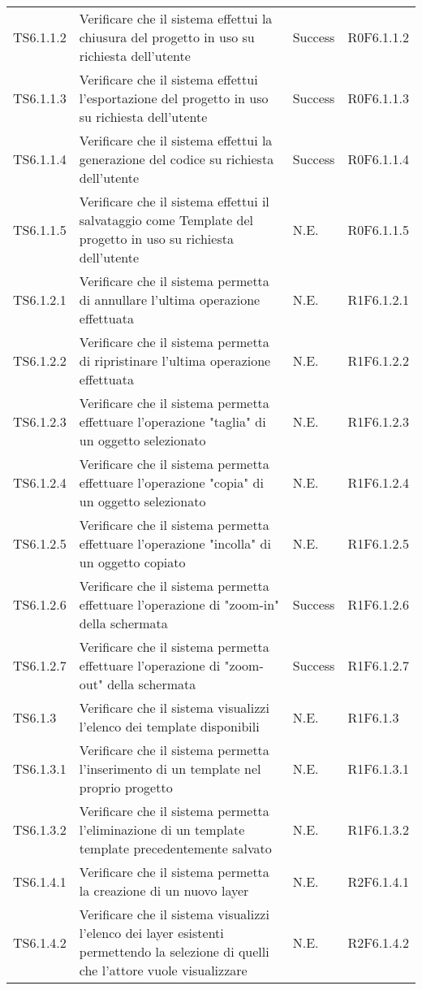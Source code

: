 \begin{longtable}{p{2.5cm}!{\VRule[1pt]}p{6cm}!{\VRule[1pt]}p{1.5cm}!{\VRule[1pt]}p{3cm}}
TS6.1.1.2 & Verificare che il sistema effettui la chiusura del progetto in uso su richiesta dell'utente & Success & R0F6.1.1.2\\
TS6.1.1.3 & Verificare che il sistema effettui l'esportazione del progetto in uso su richiesta dell'utente & Success & R0F6.1.1.3\\
TS6.1.1.4 & Verificare che il sistema effettui la generazione del codice su richiesta dell'utente & Success & R0F6.1.1.4\\
TS6.1.1.5 & Verificare che il sistema effettui il salvataggio come Template del progetto in uso su richiesta dell'utente & N.E. & R0F6.1.1.5\\
TS6.1.2.1 & Verificare che il sistema permetta di annullare l'ultima operazione effettuata & N.E. & R1F6.1.2.1\\
TS6.1.2.2 & Verificare che il sistema permetta di ripristinare l'ultima operazione effettuata & N.E. & R1F6.1.2.2\\
TS6.1.2.3 & Verificare che il sistema permetta effettuare l'operazione "taglia" di un oggetto selezionato & N.E. & R1F6.1.2.3\\
TS6.1.2.4 & Verificare che il sistema permetta effettuare l'operazione "copia" di un oggetto selezionato & N.E. & R1F6.1.2.4\\
TS6.1.2.5 & Verificare che il sistema permetta effettuare l'operazione "incolla" di un oggetto copiato & N.E. & R1F6.1.2.5\\
TS6.1.2.6 & Verificare che il sistema permetta effettuare l'operazione di "zoom-in" della schermata & Success & R1F6.1.2.6\\
TS6.1.2.7 & Verificare che il sistema permetta effettuare l'operazione di "zoom-out" della schermata & Success & R1F6.1.2.7\\
TS6.1.3 & Verificare che il sistema visualizzi l'elenco dei template disponibili & N.E. & R1F6.1.3 \\
TS6.1.3.1 & Verificare che il sistema permetta l'inserimento di un template nel proprio progetto& N.E. & R1F6.1.3.1 \\
TS6.1.3.2 & Verificare che il sistema permetta l'eliminazione di un template template precedentemente salvato & N.E. & R1F6.1.3.2 \\
TS6.1.4.1 & Verificare che il sistema permetta la creazione di un nuovo layer & N.E. & R2F6.1.4.1 \\
TS6.1.4.2 & Verificare che il sistema visualizzi l'elenco dei layer esistenti permettendo la selezione di quelli che l'attore vuole visualizzare & N.E. & R2F6.1.4.2\\

\end{longtable}
